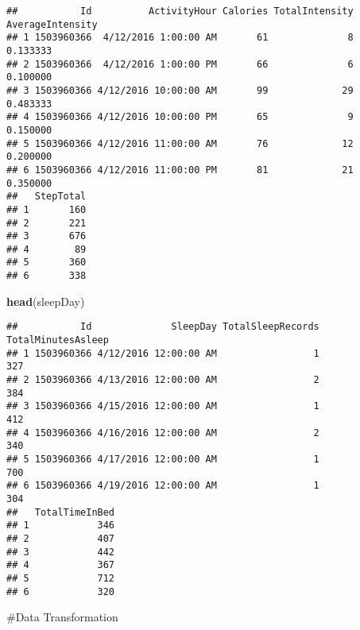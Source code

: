 \documentclass[
]{article}
\newenvironment{Shaded}{\begin{snugshade}}{\end{snugshade}}
\newcommand{\FunctionTok}[1]{\textcolor[rgb]{0.13,0.29,0.53}{\textbf{#1}}}
\newcommand{\NormalTok}[1]{#1}
\begin{document}
\begin{verbatim}
##           Id          ActivityHour Calories TotalIntensity AverageIntensity
## 1 1503960366  4/12/2016 1:00:00 AM       61              8         0.133333
## 2 1503960366  4/12/2016 1:00:00 PM       66              6         0.100000
## 3 1503960366 4/12/2016 10:00:00 AM       99             29         0.483333
## 4 1503960366 4/12/2016 10:00:00 PM       65              9         0.150000
## 5 1503960366 4/12/2016 11:00:00 AM       76             12         0.200000
## 6 1503960366 4/12/2016 11:00:00 PM       81             21         0.350000
##   StepTotal
## 1       160
## 2       221
## 3       676
## 4        89
## 5       360
## 6       338
\end{verbatim}

\begin{Shaded}
\begin{Highlighting}[]
\FunctionTok{head}\NormalTok{(sleepDay)}
\end{Highlighting}
\end{Shaded}

\begin{verbatim}
##           Id              SleepDay TotalSleepRecords TotalMinutesAsleep
## 1 1503960366 4/12/2016 12:00:00 AM                 1                327
## 2 1503960366 4/13/2016 12:00:00 AM                 2                384
## 3 1503960366 4/15/2016 12:00:00 AM                 1                412
## 4 1503960366 4/16/2016 12:00:00 AM                 2                340
## 5 1503960366 4/17/2016 12:00:00 AM                 1                700
## 6 1503960366 4/19/2016 12:00:00 AM                 1                304
##   TotalTimeInBed
## 1            346
## 2            407
## 3            442
## 4            367
## 5            712
## 6            320
\end{verbatim}

\#Data Transformation
\end{document}
